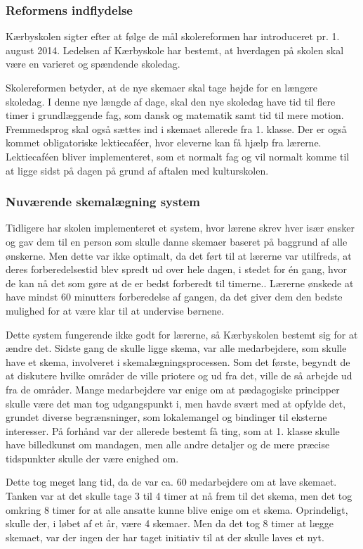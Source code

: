 \subsubsection{Reformens indflydelse}
\label{Reformens_indflydelse}
Kærbyskolen sigter efter at følge de mål skolereformen har introduceret pr. 1. august 2014. Ledelsen af Kærbyskole har bestemt, at hverdagen på skolen skal være en varieret og spændende skoledag.

Skolereformen betyder, at de nye skemaer skal tage højde for en længere skoledag. I denne nye længde af dage, skal den nye skoledag have tid til flere timer i grundlæggende fag, som dansk og matematik samt tid til mere motion. Fremmedsprog skal også sættes ind i skemaet allerede fra 1. klasse. Der er også kommet obligatoriske lektiecaféer, hvor eleverne kan få hjælp fra lærerne. Lektiecaféen bliver implementeret, som et normalt fag og vil normalt komme til at ligge sidst på dagen på grund af aftalen med kulturskolen\cite{kaerby_skolereform}.

\subsubsection {Nuværende skemalægning system}
\label{Nuværende skemalægning system}
Tidligere har skolen implementeret et system, hvor lærene skrev hver især ønsker og gav dem til en person som skulle danne skemaer baseret på baggrund af alle ønskerne. Men dette var ikke optimalt, da det ført til at lærerne var utilfreds, at deres forberedelsestid blev spredt ud over hele dagen, i stedet for én gang, hvor de kan nå det som gøre at de er bedst forberedt til timerne.. Lærerne ønskede at have mindst 60 minutters forberedelse af gangen, da det giver dem den bedste mulighed for at være klar til at undervise børnene.

Dette system fungerende ikke godt for lærerne, så Kærbyskolen bestemt sig for at ændre det. Sidste gang de skulle ligge skema, var alle medarbejdere, som skulle have et skema, involveret i skemalægningsprocessen. Som det første, begyndt de at diskutere hvilke områder de ville priotere og ud fra det, ville de så arbejde ud fra de områder. Mange medarbejdere var enige om at pædagogiske principper skulle være det man tog udgangspunkt i, men havde svært med at opfylde det, grundet diverse begrænsninger, som lokalemangel og bindinger til eksterne interesser. På forhånd var der allerede bestemt få ting, som at 1. klasse skulle have billedkunst om mandagen, men alle andre detaljer og de mere præcise tidspunkter skulle der være enighed om. 

Dette tog meget lang tid, da de var ca. 60 medarbejdere om at lave skemaet. Tanken var at det skulle tage 3 til 4 timer at nå frem til det skema, men det tog omkring 8 timer for at alle ansatte kunne blive enige om et skema. Oprindeligt, skulle der, i løbet af et år, være 4 skemaer. Men da det tog 8 timer at lægge skemaet, var der ingen der har taget initiativ til at der skulle laves et nyt. 


